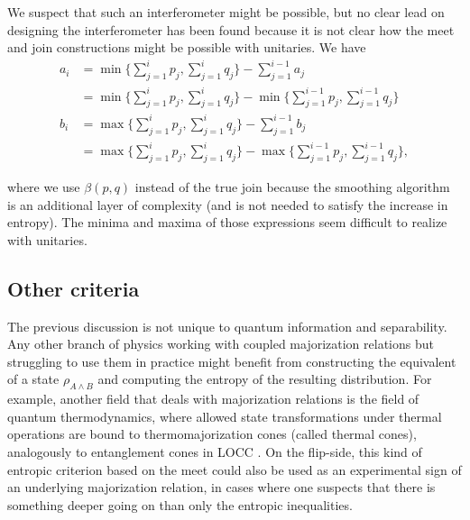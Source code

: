 We suspect that such an interferometer might be possible, but no clear lead on designing the interferometer has been found because it is not clear how the meet and join constructions might be possible with unitaries. We have
\begin{align}
    a_i &= \min \Big\{ \sum_{j=1}^{i} p_j , \sum_{j=1}^{i} q_j \Big\} - \sum_{j=1}^{i-1} a_j\\
    &= \min \Big\{ \sum_{j=1}^{i} p_j , \sum_{j=1}^{i} q_j \Big\} - \min \Big\{ \sum_{j=1}^{i-1} p_j , \sum_{j=1}^{i-1} q_j \Big\}\\
    b_i &= \max \Big\{ \sum_{j=1}^{i} p_j , \sum_{j=1}^{i} q_j \Big\} - \sum_{j=1}^{i-1} b_j\\
    &= \max \Big\{ \sum_{j=1}^{i} p_j , \sum_{j=1}^{i} q_j \Big\} - \max \Big\{ \sum_{j=1}^{i-1} p_j , \sum_{j=1}^{i-1} q_j \Big\},
\end{align}

\noindent where we use $\beta(p, q)$ instead of the true join because the smoothing algorithm is an additional layer of complexity (and is not needed to satisfy the increase in entropy). The minima and maxima of those expressions seem difficult to realize with unitaries.




\subsection{Other criteria}

The previous discussion is not unique to quantum information and separability. Any other branch of physics working with coupled majorization relations but struggling to use them in practice might benefit from constructing the equivalent of a state $\rho_{A \wedge B}$ and computing the entropy of the resulting distribution. For example, another field that deals with majorization relations is the field of quantum thermodynamics, where allowed state transformations under thermal operations are bound to thermomajorization cones (called thermal cones), analogously to entanglement cones in LOCC \cite{junior_geometric_2022, korzekwa_structure_2017}. On the flip-side, this kind of entropic criterion based on the meet could also be used as an experimental sign of an underlying majorization relation, in cases where one suspects that there is something deeper going on than only the entropic inequalities.



